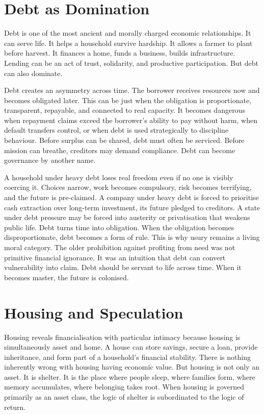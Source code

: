 \documentclass[11pt,a4paper,oneside]{book}
\begin{document}
\section*{Debt as Domination}

Debt is one of the most ancient and morally charged economic relationships. It can serve life. It helps a household survive hardship. It allows a farmer to plant before harvest. It finances a home, funds a business, builds infrastructure. Lending can be an act of trust, solidarity, and productive participation. But debt can also dominate.

Debt creates an asymmetry across time. The borrower receives resources now and becomes obligated later. This can be just when the obligation is proportionate, transparent, repayable, and connected to real capacity. It becomes dangerous when repayment claims exceed the borrower's ability to pay without harm, when default transfers control, or when debt is used strategically to discipline behaviour. Before surplus can be shared, debt must often be serviced. Before mission can breathe, creditors may demand compliance. Debt can become governance by another name.

A household under heavy debt loses real freedom even if no one is visibly coercing it. Choices narrow, work becomes compulsory, risk becomes terrifying, and the future is pre-claimed. A company under heavy debt is forced to prioritise cash extraction over long-term investment, its future pledged to creditors. A state under debt pressure may be forced into austerity or privatisation that weakens public life. Debt turns time into obligation. When the obligation becomes disproportionate, debt becomes a form of rule. This is why usury remains a living moral category. The older prohibition against profiting from need was not primitive financial ignorance. It was an intuition that debt can convert vulnerability into claim. Debt should be servant to life across time. When it becomes master, the future is colonised.

\section*{Housing and Speculation}

Housing reveals financialisation with particular intimacy because housing is simultaneously asset and home. A house can store savings, secure a loan, provide inheritance, and form part of a household's financial stability. There is nothing inherently wrong with housing having economic value. But housing is not only an asset. It is shelter. It is the place where people sleep, where families form, where memory accumulates, where belonging takes root. When housing is governed primarily as an asset class, the logic of shelter is subordinated to the logic of return.
\end{document}
